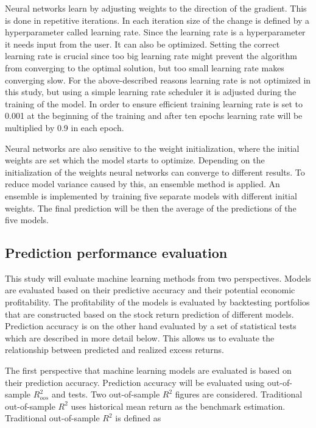 \documentclass[12pt]{article}
\begin{document}
Neural networks learn by adjusting weights to the direction of the gradient. This is done in repetitive iterations. In each iteration size of the change is defined by a hyperparameter called learning rate. Since the learning rate is a hyperparameter it needs input from the user. It can also be optimized. Setting the correct learning rate is crucial since too big learning rate might prevent the algorithm from converging to the optimal solution, but too small learning rate makes converging slow. For the above-described reasons learning rate is not optimized in this study, but using a simple learning rate scheduler it is adjusted during the training of the model. In order to ensure efficient training learning rate is set to 0.001 at the beginning of the training and after ten epochs learning rate will be multiplied by 0.9 in each epoch. \par

Neural networks are also sensitive to the weight initialization, where the initial weights are set which the model starts to optimize. Depending on the initialization of the weights neural networks can converge to different results. To reduce model variance caused by this, an ensemble method is applied. An ensemble is implemented by training five separate models with different initial weights. The final prediction will be then the average of the predictions of the five models. \par

\subsection{Prediction performance evaluation}\label{PredictionPerformanceEvaluation}

This study will evaluate machine learning methods from two perspectives. Models are evaluated based on their predictive accuracy and their potential economic profitability. The profitability of the models is evaluated by backtesting portfolios that are constructed based on the stock return prediction of different models. Prediction accuracy is on the other hand evaluated by a set of statistical tests which are described in more detail below. This allows us to evaluate the relationship between predicted and realized excess returns. \par

The first perspective that machine learning models are evaluated is based on their prediction accuracy. Prediction accuracy will be evaluated using out-of-sample $R^{2}_{oos}$ and \citet{Diebold1995} tests. Two out-of-sample $R^{2}$ figures are considered. Traditional out-of-sample $R^{2}$ uses historical mean return as the benchmark estimation. Traditional out-of-sample $R^{2}$ is defined as \par
\end{document}
